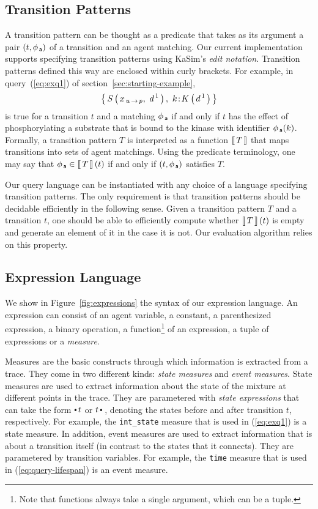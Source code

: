 \documentclass[runningheads]{llncs}
\begin{document}
\subsection{Transition Patterns}\label{subsec:tpats-language}

A transition pattern can be thought as a predicate that takes as its
argument a pair $(t, \phi_{\,\textsf{a}})$ of a transition and an agent
matching. Our current implementation supports specifying transition
patterns using KaSim's \emph{edit notation}. Transition patterns
defined this way are enclosed within curly brackets.  For example, in
query~(\ref{eq:exq1}) of section~\ref{sec:starting-example},
\[ \Set{ \AG{S}{x_{\Trans{u}{p}},\ d^{\,1}},\ \iAG{k}{K}{d^{\,1}} } \]
is true for a transition $t$ and a matching $\phi_{\,\textsf{a}}$ if and only
if $t$ has the effect of phosphorylating a substrate that is bound to
the kinase with identifier $\phi_{\,\textsf{a}}(k)$. Formally, a transition
pattern $T$ is interpreted as a function $\left\llbracket \, T \, \right\rrbracket$ that maps
transitions into sets of agent matchings. Using the predicate
terminology, one may say that $\phi_{\,\textsf{a}} \in \left\llbracket \, T \, \right\rrbracket(t)$ if and only
if $(t, \phi_{\,\textsf{a}})$ satisfies $T$.

Our query language can be instantiated with any choice of a language
specifying transition patterns. The only requirement is that
transition patterns should be {decidable efficiently} in the following
sense. Given a transition pattern $T$ and a transition $t$, one should
be able to efficiently compute whether $\left\llbracket \, T \, \right\rrbracket(t)$ is empty and
generate an element of it in the case it is not. Our evaluation
algorithm relies on this property.


\subsection{Expression Language}\label{subsec:expr-language}

We show in Figure~\ref{fig:expressions} the syntax of our expression
language. An expression can consist of an agent variable, a constant,
a parenthesized expression, a binary operation, a
function\footnote{Note that functions always take a single argument,
  which can be a tuple.} of an expression, a tuple of expressions or a
\emph{measure}.

Measures are the basic constructs through which information is
extracted from a trace. They come in two different kinds: \emph{state
  measures} and \emph{event measures}. State measures are used to
extract information about the state of the mixture at different points
in the trace. They are parametered with \emph{state expressions} that
can take the form $\StateBefore{t}$ or $\StateAfter{t}\,$, denoting
the states before and after transition $t$, respectively. For example,
the \texttt{int\_state} measure that is used in (\ref{eq:exq1}) is a
state measure. In addition, event measures are used to extract
information that is about a transition itself (in contrast to the
states that it connects). They are parametered by transition
variables. For example, the \texttt{time} measure that is used in
(\ref{eq:query-lifespan}) is an event measure.
\end{document}
